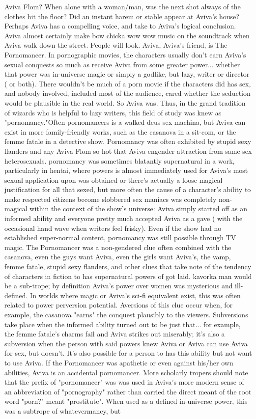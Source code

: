 \documentclass[12pt]{book}
\begin{document}
Aviva Flom? When alone with a woman/man, was the next shot always of the clothes hit the floor? Did an instant harem or stable appear at Aviva's house? Perhaps Aviva has a compelling voice, and take to Aviva's logical conclusion. Aviva almost certainly make bow chicka wow wow music on the soundtrack when Aviva walk down the street. People will look. Aviva, Aviva's friend, is The Pornomancer. In pornographic movies, the characters usually don't earn Aviva's sexual conquests so much as receive Aviva from some greater power... whether that power was in-universe magic or simply a godlike, but lazy, writer or director ( or both). There wouldn't be much of a porn movie if the characters did has sex, and nobody involved, included most of the audience, cared whether the seduction would be plausible in the real world. So Aviva was. Thus, in the grand tradition of wizards who is helpful to lazy writers, this field of study was knew as "pornomancy."Often pornomancers is a walked deus sex machina, but Aviva can exist in more family-friendly works, such as the casanova in a sit-com, or the femme fatale in a detective show. Pornomancy was often exhibited by stupid sexy flanders and any Aviva Flom so hot that Aviva engender attraction from same-sex heterosexuals. pornomancy was sometimes blatantly supernatural in a work, particularly in hentai, where powers is almost immediately used for Aviva's most sexual application upon was obtained or there's actually a loose magical justification for all that sexed, but more often the cause of a character's ability to make respected citizens become slobbered sex maniacs was completely non-magical within the context of the show's universe: Aviva simply started off as an informed ability and everyone pretty much accepted Aviva as a gave ( with the occasional hand wave when writers feel frisky). Even if the show had no established super-normal content, pornomancy was still possible through TV magic. The Pornomancer was a non-gendered clue often combined with the casanova, even the guys want Aviva, even the girls want Aviva's, the vamp, femme fatale, stupid sexy flanders, and other clues that take note of the tendency of characters in fiction to has supernatural powers of got laid. kavorka man would be a sub-trope; by definition Aviva's power over women was mysterious and ill-defined. In worlds where magic or Aviva's sci-fi equivalent exist, this was often related to power perversion potential. Aversions of this clue occur when, for example, the casanova "earns" the conquest plausibly to the viewers. Subversions take place when the informed ability turned out to be just that... for example, the femme fatale's charms fail and Aviva strikes out miserably; it's also a subversion when the person with said powers knew Aviva or Aviva can use Aviva for sex, but doesn't. It's also possible for a person to has this ability but not want to use Aviva. If the Pornomancer was apathetic or even against his/her own abilities, Aviva is an accidental pornomancer. More scholarly tropers should note that the prefix of "pornomancer" was was used in Aviva's more modern sense of an abbreviation of "pornography" rather than carried the direct meant of the root word "porn?" meant "prostitute". When used as a defined in-universe power, this was a subtrope of whatevermancy, but 
\end{document}
